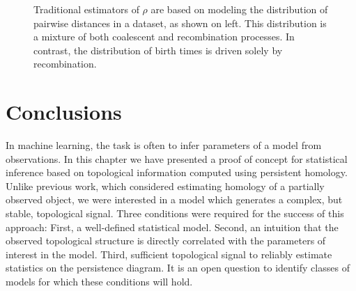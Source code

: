 \begin{figure}
\centering
{}
\caption[Comparing traditional estimators of $\rho$ to the TDA-estimator]{Traditional estimators of $\rho$ are based on modeling the distribution of pairwise distances in a dataset, as shown on left. This distribution is a mixture of both coalescent and recombination processes. In contrast, the distribution of birth times is driven solely by recombination.}
\label{fig:estimator_comparison}
\end{figure}

\section{Conclusions}
\label{parametric_inference:sec:discussion}

In machine learning, the task is often to infer parameters of a model from observations.
In this chapter we have presented a proof of concept for statistical inference based on topological information computed using persistent homology.
Unlike previous work, which considered estimating homology of a partially observed object, we were interested in a model which generates a complex, but stable, topological signal.
Three conditions were required for the success of this approach:
First, a well-defined statistical model.
Second, an intuition that the observed topological structure is directly correlated with the parameters of interest in the model.
Third, sufficient topological signal to reliably estimate statistics on the persistence diagram.
It is an open question to identify classes of models for which these conditions will hold.
